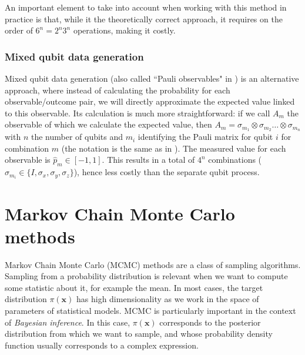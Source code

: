 \documentclass[12pt]{memoir}
\newcommand{\mb}{\mathbf}
\newcommand{\ti}{\textit}
\begin{document}
An important element to take into account when working with this method in practice is that, while it the theoretically correct approach, it requires on the order of $6^n = 2^n 3^n$ operations, making it costly.



\subsubsection*{Mixed qubit data generation}\label{section:mixed-qub-dg}

Mixed qubit data generation (also called ``Pauli observables" in \cite{Guta20}) is an alternative approach, where instead of calculating the probability for each observable/outcome pair, we will directly approximate the expected value linked to this observable. Its calculation is much more straightforward: if we call $A_m$ the observable of which we calculate the expected value, then $A_m = \sigma_{m_1} \otimes \sigma_{m_2} \dots \otimes \sigma_{m_n}$ with $n$ the number of qubits and $m_i$ identifying the Pauli matrix for qubit $i$ for combination $m$ (the notation is the same as in \cite{meth:bayesian:Langevin:ACMT2024}). The measured value for each observable is $\hat p_m \in[-1, 1]$. This results in a total of $4^n$ combinations ($\sigma_{m_i} \in \{I, \sigma_x, \sigma_y, \sigma_z\}$), hence less costly than the separate qubit process.

\newpage

\section{Markov Chain Monte Carlo methods}\label{section:mcmc-methods}
Markov Chain Monte Carlo (MCMC) methods are a class of sampling algorithms. Sampling from a probability distribution is relevant when we want to compute some statistic about it, for example the mean. In most cases, the target distribution $\pi(\mb x)$ has high dimensionality as we work in the space of parameters of statistical models. MCMC is particularly important in the context of \ti{Bayesian inference}. In this case, $\pi(\mb x)$ corresponds to the posterior distribution from which we want to sample, and whose probability density function usually corresponds to a complex expression. \medbreak
\end{document}
